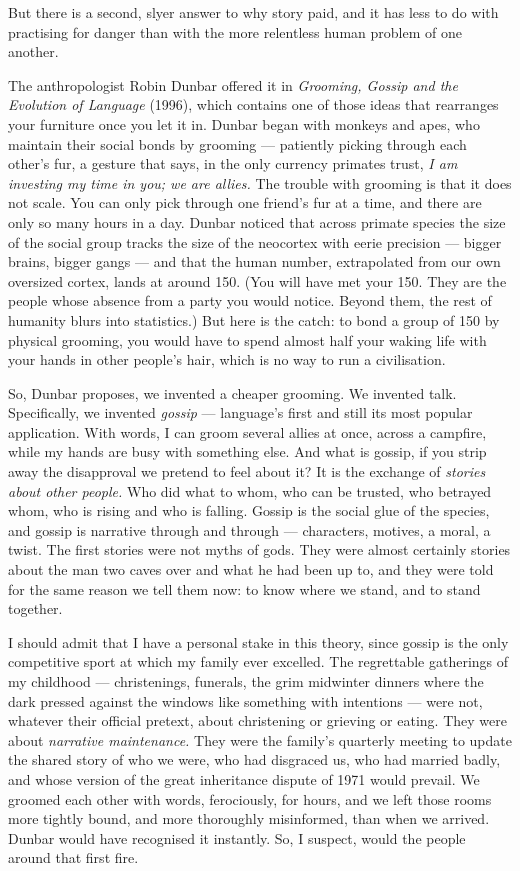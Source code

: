 But there is a second, slyer answer to why story paid, and it has less to do with practising for danger than with the more relentless human problem of one another.

The anthropologist Robin Dunbar offered it in \emph{Grooming, Gossip and the Evolution of Language} (1996), which contains one of those ideas that rearranges your furniture once you let it in. Dunbar began with monkeys and apes, who maintain their social bonds by grooming — patiently picking through each other's fur, a gesture that says, in the only currency primates trust, \emph{I am investing my time in you; we are allies.} The trouble with grooming is that it does not scale. You can only pick through one friend's fur at a time, and there are only so many hours in a day. Dunbar noticed that across primate species the size of the social group tracks the size of the neocortex with eerie precision — bigger brains, bigger gangs — and that the human number, extrapolated from our own oversized cortex, lands at around 150. (You will have met your 150. They are the people whose absence from a party you would notice. Beyond them, the rest of humanity blurs into statistics.) But here is the catch: to bond a group of 150 by physical grooming, you would have to spend almost half your waking life with your hands in other people's hair, which is no way to run a civilisation.

So, Dunbar proposes, we invented a cheaper grooming. We invented talk. Specifically, we invented \emph{gossip} — language's first and still its most popular application. With words, I can groom several allies at once, across a campfire, while my hands are busy with something else. And what is gossip, if you strip away the disapproval we pretend to feel about it? It is the exchange of \emph{stories about other people.} Who did what to whom, who can be trusted, who betrayed whom, who is rising and who is falling. Gossip is the social glue of the species, and gossip is narrative through and through — characters, motives, a moral, a twist. The first stories were not myths of gods. They were almost certainly stories about the man two caves over and what he had been up to, and they were told for the same reason we tell them now: to know where we stand, and to stand together.

I should admit that I have a personal stake in this theory, since gossip is the only competitive sport at which my family ever excelled. The regrettable gatherings of my childhood — christenings, funerals, the grim midwinter dinners where the dark pressed against the windows like something with intentions — were not, whatever their official pretext, about christening or grieving or eating. They were about \emph{narrative maintenance.} They were the family's quarterly meeting to update the shared story of who we were, who had disgraced us, who had married badly, and whose version of the great inheritance dispute of 1971 would prevail. We groomed each other with words, ferociously, for hours, and we left those rooms more tightly bound, and more thoroughly misinformed, than when we arrived. Dunbar would have recognised it instantly. So, I suspect, would the people around that first fire.

